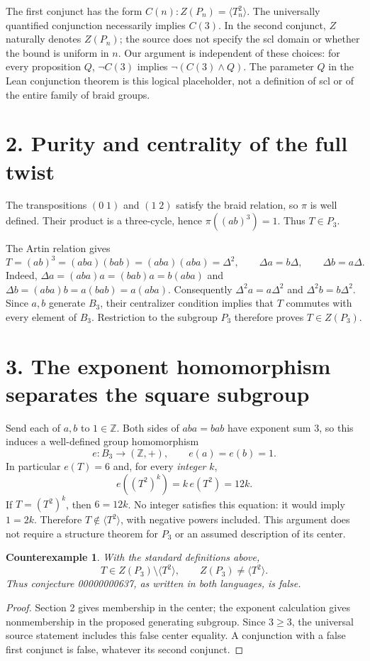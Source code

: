 \documentclass[10pt]{article}
\newcommand{\Z}{\mathbb Z}
\newtheorem*{theorem}{Counterexample}
\begin{document}
The first conjunct has the form $C(n): Z(P_n)=\langle T_n^2\rangle$.
The universally quantified conjunction necessarily implies $C(3)$.
In the second conjunct, $Z$ naturally denotes $Z(P_n)$; the source does not
specify the scl domain or whether the bound is uniform in $n$.
Our argument is independent of these choices: for every proposition $Q$,
$\neg C(3)$ implies $\neg(C(3)\land Q)$. The parameter $Q$ in the Lean
conjunction theorem is this logical placeholder, not a definition of scl or
of the entire family of braid groups.

\section*{2. Purity and centrality of the full twist}
The transpositions $(0\;1)$ and $(1\;2)$ satisfy the braid relation, so $\pi$
is well defined. Their product is a three-cycle, hence $\pi((ab)^3)=1$.
Thus $T\in P_3$.

The Artin relation gives
\[
 T=(ab)^3=(aba)(bab)=(aba)(aba)=\Delta^2,
 \qquad \Delta a=b\Delta,\qquad \Delta b=a\Delta.
\]
Indeed, $\Delta a=(aba)a=(bab)a=b(aba)$ and
$\Delta b=(aba)b=a(bab)=a(aba)$.
Consequently $\Delta^2a=a\Delta^2$ and $\Delta^2b=b\Delta^2$.
Since $a,b$ generate $B_3$, their centralizer condition implies that $T$
commutes with every element of $B_3$. Restriction to the subgroup $P_3$
therefore proves $T\in Z(P_3)$.

\newpage
\section*{3. The exponent homomorphism separates the square subgroup}
Send each of $a,b$ to $1\in\Z$. Both sides of $aba=bab$ have exponent sum
$3$, so this induces a well-defined group homomorphism
\[
 e:B_3\longrightarrow (\Z,+),\qquad e(a)=e(b)=1.
\]
In particular $e(T)=6$ and, for every \emph{integer} $k$,
\[
 e((T^2)^k)=k\,e(T^2)=12k.
\]
If $T=(T^2)^k$, then $6=12k$. No integer satisfies this equation: it would
imply $1=2k$. Therefore $T\notin\langle T^2\rangle$, with negative powers
included. This argument does not require a structure theorem for $P_3$ or
an assumed description of its center.

\begin{theorem}
With the standard definitions above,
\[
 T\in Z(P_3)\setminus\langle T^2\rangle,\qquad
 Z(P_3)\ne\langle T^2\rangle.
\]
Thus conjecture 00000000637, as written in both languages, is false.
\end{theorem}
\begin{proof}
Section 2 gives membership in the center; the exponent calculation gives
nonmembership in the proposed generating subgroup. Since $3\geq3$, the
universal source statement includes this false center equality. A conjunction
with a false first conjunct is false, whatever its second conjunct.
\end{proof}
\end{document}
